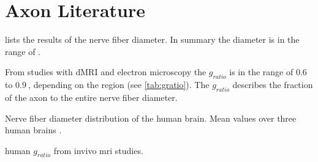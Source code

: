 \section{Axon Literature}
\label{sec:axonMicroscopy}
%
 lists the results of the nerve fiber diameter. In summary the diameter is in the range of .
\par
% 
From studies with \ac{dMRI} and electron microscopy
\cite{Stikov2015,Dean2016,Mohammadi2015,Cercignani2017,Berman2018,Jung2018} the $g_{\mathit{ratio}}$ is in the range of $\SI{0.6}{}$ to $\SI{0.9}{}$, depending on the region (see \cref{tab:gratio}).
The $g_{\mathit{ratio}}$ describes the fraction of the axon to the entire nerve fiber diameter.
%
\begin{table}[!b]
\centering
{}
\caption{Nerve fiber diameter distribution of the human brain. Mean values over three human brains \cite{Liewald2014}.}
\label{tab:axonDiameter}
\end{table}
%
\begin{table}[!b]
\centering
{}
\caption{human $g_{\mathit{ratio}}$ from invivo mri studies.}
\label{tab:gratio}
\end{table}